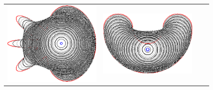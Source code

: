 \begin{figure}
\begin{tabular}{p{3em}ccc}
\includegraphics[scale=0.25]{figures/chapter6/level-effect/flower/improve/len_pen0/radius-5/level3/summary.pdf} &
\includegraphics[scale=0.25]{figures/chapter6/level-effect/bean/improve/len_pen0/radius-5/level3/summary.pdf} \\[2em]

\end{tabular}
\end{figure}
